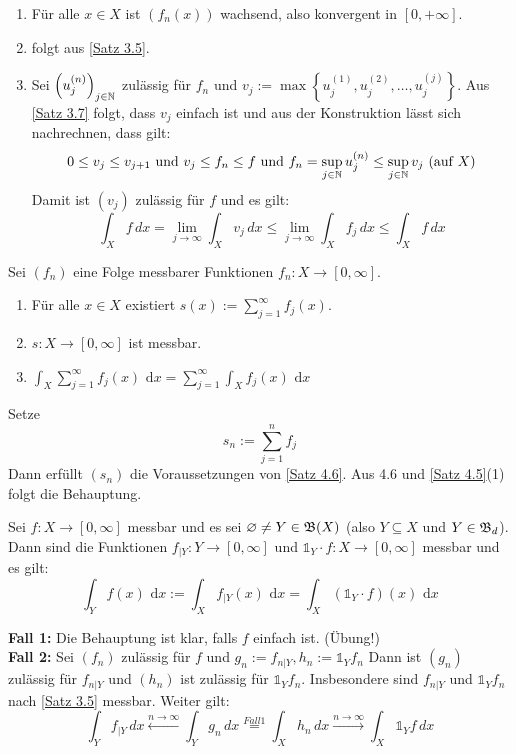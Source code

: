 \documentclass[a4paper,twoside,DIV15,BCOR12mm,chapterprefix=true,headings=onelinechapter]{scrbook}
\begin{document}
\begin{beweis}
\begin{enumerate}
\item Für alle $x\in X$ ist \(\left(f_n(x)\right)\) wachsend, also konvergent in \([0,+\infty]\).
\item folgt aus \ref{Satz 3.5}.
\item Sei \( \left(u_j^{(n)}\right)_{j\in\mathbb{N}} \) zulässig für $f_n$ und \(v_j:=\max\left\{u_j^{(1)}, u_j^{(2)}, \ldots , u_j^{(j)} \right\} \).
Aus \ref{Satz 3.7} folgt, dass $v_j$ einfach ist und aus der Konstruktion lässt sich nachrechnen, dass gilt:
 \[0\leq v_j\leq v_{j+1} \text{ und } v_j\leq f_n\leq f \text{ und } f_n=\sup\limits_{j\in\mathbb{N}}u_j^{(n)} \leq \sup\limits_{j\in\mathbb{N}}v_j \text{ (auf $X$)}\]
Damit ist $(v_j)$ zulässig für $f$ und es gilt:
\[ \int_Xf\,dx=\lim\limits_{j\to\infty}\int_Xv_j\,dx\leq\lim\limits_{j\to\infty}\int_Xf_j\,dx\leq\int_Xf\,dx \]
\end{enumerate}
\end{beweis}

\begin{satz}
\label{Satz 4.7}
Sei $(f_n)$ eine Folge messbarer Funktionen $f_n:X\to[0,\infty]$.
\begin{enumerate}
\item Für alle $x\in X$ existiert $s(x):=\sum_{j=1}^\infty f_j(x)$.
\item $s:X\to[0,\infty]$ ist messbar.
\item $\int_X \sum_{j=1}^\infty f_j(x) \text{ d}x= \sum_{j=1}^\infty \int_X f_j(x) \text{ d}x$
\end{enumerate}
\end{satz}

\begin{beweis}
Setze \[s_n:=\sum\limits_{j=1}^nf_j\]
Dann erfüllt \((s_n)\) die Voraussetzungen von \ref{Satz 4.6}. Aus 4.6 und \ref{Satz 4.5}(1) folgt die Behauptung.
\end{beweis}

\begin{satz}
\label{Satz 4.8}
Sei $f:X\to[0,\infty]$ messbar und es sei $\varnothing\ne Y\in\mathfrak{B}(X)$ (also $Y\subseteq X$ und $Y\in\mathfrak{B}_d$). Dann sind die Funktionen $f_{|Y}:Y\to[0,\infty]$ und $\mathds{1}_Y\cdot f:X\to[0,\infty]$ messbar und es gilt:
\[\int_Y f(x) \text{ d}x:=\int_X f_{|Y}(x) \text{ d}x=\int_X (\mathds{1}_Y\cdot f)(x) \text{ d}x\]
\end{satz}

\begin{beweis}
\textbf{Fall 1:} Die Behauptung ist klar, falls $f$ einfach ist. (Übung!)\\
\textbf{Fall 2:} Sei \((f_n)\) zulässig für $f$ und \(g_n:=f_{n|Y} , h_n:=\mathds{1}_Y f_n\)
Dann ist \((g_n)\) zulässig für \(f_{n|Y}\) und \((h_n)\) ist zulässig für \(\mathds{1}_Y f_n\).
Insbesondere sind  \(f_{n|Y}\) und \(\mathds{1}_Y f_n\) nach \ref{Satz 3.5} messbar.
Weiter gilt:
\[ \int_Y f_{|Y}\,dx \overset{n\to\infty}\longleftarrow \int_Yg_n\,dx \overset{Fall 1}=\int_Xh_n\,dx\overset{n\to\infty}\longrightarrow \int_X\mathds{1}_Yf\,dx   \]
\end{beweis}
\end{document}
